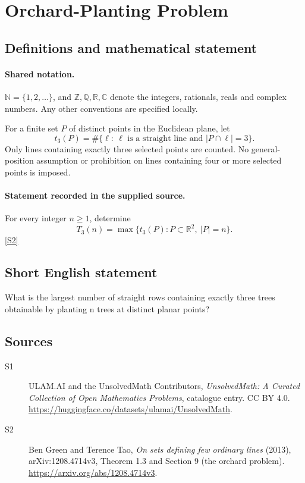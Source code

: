 \documentclass[11pt]{article}
\newcommand{\sref}[2]{\hyperlink{source:#1:#2}{[S#2]}}
\begin{document}
\section{Orchard-Planting Problem}\label{statement}

\subsection{Definitions and mathematical statement}

\paragraph{Shared notation.}$\mathbb N=\{1,2,\ldots\}$, and $\mathbb Z,\mathbb Q,\mathbb R,\mathbb C$ denote the integers, rationals, reals and complex numbers. Any other conventions are specified locally.


For a finite set $P$ of distinct points in the Euclidean plane, let
\[
 t_3(P)=\#\{\ell:\ \ell\text{ is a straight line and }|P\cap\ell|=3\}.
\]
Only lines containing exactly three selected points are counted. No general-position assumption or prohibition on lines containing four or more selected points is imposed.
\paragraph{Statement recorded in the supplied source.}
For every integer $n\ge1$, determine
\[
 T_3(n)=\max\{t_3(P):P\subset\mathbb R^2,\ |P|=n\}.
\]
\sref{statement}{2}
\subsection{Short English statement}
What is the largest number of straight rows containing exactly three trees obtainable by planting n trees at distinct planar points?
\subsection{Sources}
\begin{description}
\item[\hypertarget{source:statement:1}{S1}] ULAM.AI and the UnsolvedMath Contributors, \emph{UnsolvedMath: A Curated Collection of Open Mathematics Problems}, catalogue entry. CC BY 4.0. \url{https://huggingface.co/datasets/ulamai/UnsolvedMath}.
\item[\hypertarget{source:statement:2}{S2}] Ben Green and Terence Tao, \emph{On sets defining few ordinary lines} (2013), arXiv:1208.4714v3, Theorem 1.3 and Section 9 (the orchard problem). \url{https://arxiv.org/abs/1208.4714v3}.
\end{description}
\label{end:statement}
\end{document}
